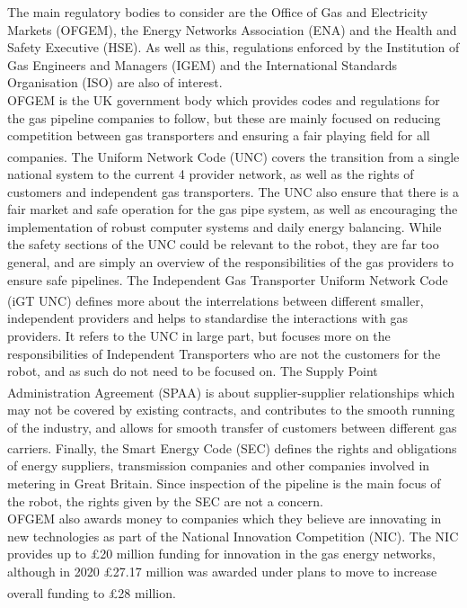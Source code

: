 \documentclass[11pt]{article}		%
\begin{document}
			The main regulatory bodies to consider are the Office of Gas and Electricity Markets (OFGEM), the Energy Networks Association (ENA) and the Health and Safety Executive (HSE).
			As well as this, regulations enforced by the Institution of Gas Engineers and Managers (IGEM) and the International Standards Organisation (ISO) are also of interest.
 			\\
			OFGEM is the UK government body which provides codes and regulations for the gas pipeline companies to follow, but these are mainly focused on reducing competition between gas transporters and ensuring a fair playing field for all companies.
			The Uniform Network Code (UNC)\textsuperscript{\cite{joint2005uniform}} covers the transition from a single national system to the current 4 provider network, as well as the rights of customers and independent gas transporters.
			The UNC also ensure that there is a fair market and safe operation for the gas pipe system, as well as encouraging the implementation of robust computer systems and daily energy balancing.
			While the safety sections of the UNC could be relevant to the robot, they are far too general, and are simply an overview of the responsibilities of the gas providers to ensure safe pipelines.
			The Independent Gas Transporter Uniform Network Code (iGT UNC)\textsuperscript{\cite{igt2021independent}} defines more about the interrelations between different smaller, independent providers and helps to standardise the interactions with gas providers.
			It refers to the UNC in large part, but focuses more on the responsibilities of Independent Transporters who are not the customers for the robot, and as such do not need to be focused on.
			The Supply Point Administration Agreement (SPAA)\textsuperscript{\cite{spaa2021supply}} is about supplier-supplier relationships which may not be covered by existing contracts, and contributes to the smooth running of the industry, and allows for smooth transfer of customers between different gas carriers.
			Finally, the Smart Energy Code (SEC)\textsuperscript{\cite{smart2021smart}} defines the rights and obligations of energy suppliers, transmission companies and other companies involved in metering in Great Britain.
			Since inspection of the pipeline is the main focus of the robot, the rights given by the SEC are not a concern.
			\\
			OFGEM also awards money to companies which they believe are innovating in new technologies as part of the National Innovation Competition (NIC).
			The NIC provides up to £20 million funding for innovation in the gas energy networks, although in 2020 £27.17 million was awarded under plans to move to increase overall funding to £28 million\textsuperscript{\cite{ofgem2020nic}}.
\end{document}
